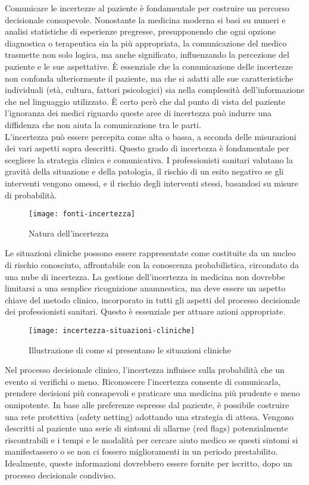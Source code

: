 Comunicare le incertezze al paziente è fondamentale per costruire un percorso decisionale consapevole. Nonostante la medicina moderna si basi su numeri e analisi statistiche di  esperienze pregresse, presupponendo che ogni opzione diagnostica o terapeutica sia la più appropriata, la comunicazione del medico trasmette non solo logica, ma anche significato, influenzando la percezione del paziente e le sue aspettative. È essenziale che la comunicazione delle incertezze non confonda ulteriormente il paziente, ma che si adatti alle sue caratteristiche individuali (età, cultura, fattori psicologici) sia nella complessità dell'informazione che nel linguaggio utilizzato. È certo però che dal punto di vista del paziente l'ignoranza dei medici riguardo queste aree di incertezza può indurre una diffidenza che non aiuta la comunicazione tra le parti. \\
L'incertezza può essere percepita come alta o bassa, a seconda delle misurazioni dei vari aspetti sopra descritti. Questo grado di incertezza è fondamentale per scegliere la strategia clinica e comunicativa. I professionisti sanitari valutano la gravità della situazione e della patologia, il rischio di un esito negativo se gli interventi vengono omessi, e il rischio degli interventi stessi, basandosi su misure di probabilità.\\

\begin{figure}[!ht] 
    \centering 
    \texttt{[image: fonti-incertezza]} 
    \caption{Natura dell'incertezza}
\end{figure}

Le situazioni cliniche possono essere rappresentate come costituite da un nucleo di rischio conosciuto, affrontabile con la conoscenza probabilistica, circondato da una nube di incertezza. La gestione dell'incertezza in medicina non dovrebbe limitarsi a una semplice ricognizione anamnestica, ma deve essere un aspetto chiave del metodo clinico, incorporato in tutti gli aspetti del processo decisionale dei professionisti sanitari. Questo è essenziale per attuare azioni appropriate.\\
\begin{figure}[!ht] 
    \centering 
    \texttt{[image: incertezza-situazioni-cliniche]} 
    \caption{Illustrazione di come si presentano le situazioni cliniche}
\end{figure}


Nel processo decisionale clinico, l'incertezza influisce sulla probabilità che un evento si verifichi o meno. Riconoscere l'incertezza consente di comunicarla, prendere decisioni più consapevoli e praticare una medicina più prudente e meno onnipotente.
In base alle preferenze espresse dal paziente, è possibile costruire una rete protettiva (safety netting) adottando una strategia di attesa. Vengono descritti al paziente una serie di sintomi di allarme (red flags) potenzialmente riscontrabili e i tempi e le modalità per cercare aiuto medico se questi sintomi si manifestassero o se non ci fossero miglioramenti in un periodo prestabilito. Idealmente, queste informazioni dovrebbero essere fornite per iscritto, dopo un processo decisionale condiviso.\\

